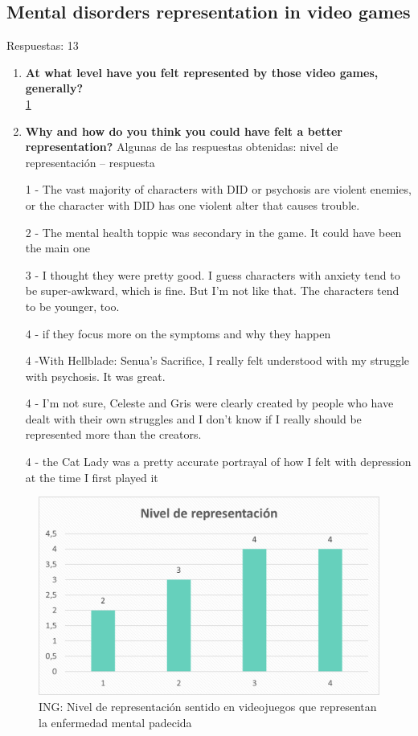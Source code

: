 \documentclass[12pt, a4paper,twoside,titlepage]{book}
\begin{document}
\subsection{Mental disorders representation in video games}
Respuestas: 13
\begin{enumerate}[label=\textbf{\arabic*}.]
     \item \textbf{At what level have you felt represented by those video games, generally?}\\
     \ref{fig:INGNivel}
     \item \textbf{Why and how do you think you could have felt a better representation?}
     \label{representacionIngles}
     Algunas de las respuestas obtenidas: nivel de representación – respuesta
     
    1 - The vast majority of characters with DID or psychosis are violent enemies, or the character with DID has one violent alter that causes trouble.
    
    2 - The mental health toppic was secondary in the game. It could have been the main one
    
    3 - I thought they were pretty good. I guess characters with anxiety tend to be super-awkward, which is fine. But I'm not like that. The characters tend to be younger, too.
    
    4 - if they focus more on the symptoms and why they happen
    
    4 -With Hellblade: Senua's Sacrifice, I really felt understood with my struggle with psychosis. It was great.
    
    4 - I'm not sure, Celeste and Gris were clearly created by people who have dealt with their own struggles and I don't know if I really should be represented more than the creators.
    
    4 - the Cat Lady was a pretty accurate portrayal of how I felt with depression at the time I first played it

     
\end{enumerate}

\begin{figure}
    \centering
    \includegraphics[width=.8\linewidth]{ANEXO ING/26AnexINGNivel}
    \caption{ING: Nivel de representación sentido en videojuegos que representan la enfermedad mental padecida}
    \label{fig:INGNivel}
\end{figure}
\end{document}
